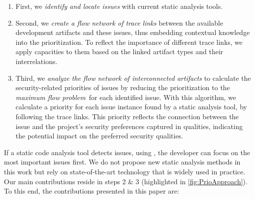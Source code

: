 \begin{enumerate}[label=\arabic*.]
    \item First, we \emph{identify and locate %
    issues} with current static analysis tools. %

\item Second, we \emph{create a flow network of trace links} between the available development artifacts and these issues, thus embedding contextual knowledge into the prioritization.
To reflect the importance of different trace links, we apply capacities to them %
based on the linked artifact types and their interrelations.


\item Third, we \emph{analyze the flow network of interconnected artifacts} to calculate the security-related priorities of issues by reducing the prioritization to the \textit{maximum flow problem}\,\cite{harris1955} for each identified issue.
With this algorithm, we calculate a priority for each issue instance found by a static analysis tool, by following the trace links.
This priority reflects the connection between the issue and the project's security preferences captured in qualities, indicating the potential impact on the preferred security qualities.
\end{enumerate}

\noindent
If a static code analysis tool detects %
issues, using \appr{}, the developer can focus on the most important issues first.
%
We do not propose new static analysis methods in this work but rely on state-of-the-art technology that is widely used in practice.
Our main contributions reside in %
steps 2 \& 3 (highlighted in \autoref{fig:PrioApproach}).
%
To this end, the contributions presented in this paper are:

